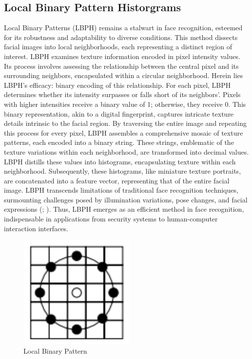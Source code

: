 \documentclass[
]{article}
\begin{document}
\begin{multicols}{2}

\section{Local Binary Pattern Historgrams}
Local Binary Patterns (LBPH) remains a stalwart in face recognition, esteemed for its robustness and adaptability to diverse conditions. This method dissects facial images into local neighborhoods, each representing a distinct region of interest. LBPH examines texture information encoded in pixel intensity values. Its process involves assessing the relationship between the central pixel and its surrounding neighbors, encapsulated within a circular neighborhood. Herein lies LBPH's efficacy: binary encoding of this relationship. For each pixel, LBPH determines whether its intensity surpasses or falls short of its neighbors'. Pixels with higher intensities receive a binary value of 1; otherwise, they receive 0. This binary representation, akin to a digital fingerprint, captures intricate texture details intrinsic to the facial region. By traversing the entire image and repeating this process for every pixel, LBPH assembles a comprehensive mosaic of texture patterns, each encoded into a binary string. These strings, emblematic of the texture variations within each neighborhood, are transformed into decimal values. LBPH distills these values into histograms, encapsulating texture within each neighborhood. Subsequently, these histograms, like miniature texture portraits, are concatenated into a feature vector, representing that of the entire facial image. LBPH transcends limitations of traditional face recognition techniques, surmounting challenges posed by illumination variations, pose changes, and facial expressions (\cite{ahonen2004}; \cite{tan2007}). Thus, LBPH emerges as an efficient method in face recognition, indispensable in applications from security systems to human-computer interaction interfaces.

\end{multicols}

\begin{figure}[htbp]
  \centering
  \includegraphics[width=0.4\linewidth]{images/lbph.png}
  \caption{Local Binary Pattern}
\end{figure}
\end{document}
